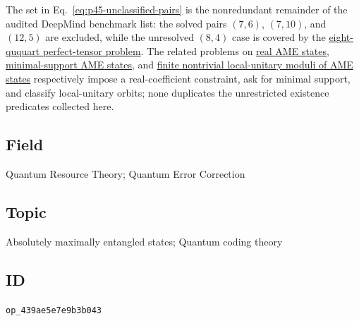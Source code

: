 The set in Eq.~\eqref{eq:p45-unclassified-pairs} is the nonredundant remainder
of the audited DeepMind benchmark list: the solved pairs $(7,6)$, $(7,10)$,
and $(12,5)$ are excluded, while the unresolved $(8,4)$ case is covered by the
\href{https://qiqc-op.com/problem/op_b08ad9d4371ed0cb/}{eight-ququart perfect-tensor problem}.  The related problems on
\href{https://qiqc-op.com/problem/op_f60b9a99d7945e3b/}{real AME states},
\href{https://qiqc-op.com/problem/op_7a17786328198e24/}{minimal-support AME states}, and
\href{https://qiqc-op.com/problem/op_0c86d9293aba3b01/}{finite nontrivial local-unitary moduli of AME states}
respectively impose a real-coefficient constraint, ask for minimal support,
and classify local-unitary orbits; none
duplicates the unrestricted existence predicates collected here.

\subsection*{Field}

Quantum Resource Theory; Quantum Error Correction

\subsection*{Topic}

Absolutely maximally entangled states; Quantum coding theory

\subsection*{ID}

\texttt{op\_439ae5e7e9b3b043}
